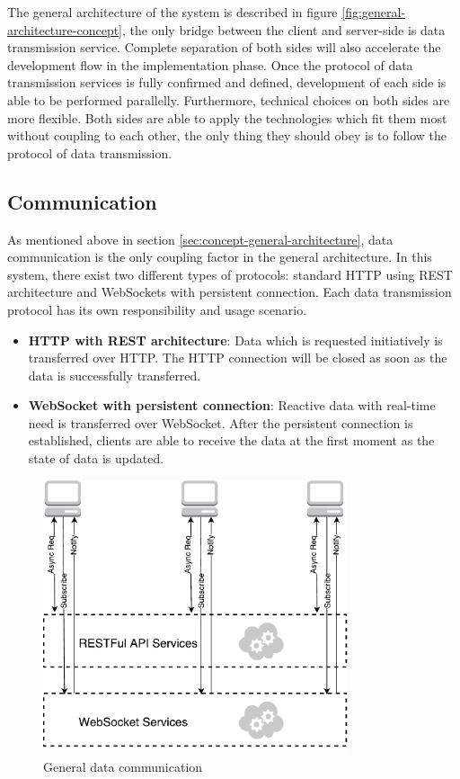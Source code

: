 The general architecture of the system is described in figure \ref{fig:general-architecture-concept}, the only bridge between the client and server-side is data transmission service. Complete separation of both sides will also accelerate the development flow in the implementation phase. Once the protocol of data transmission services is fully confirmed and defined, development of each side is able to be performed parallelly. Furthermore, technical choices on both sides are more flexible. Both sides are able to apply the technologies which fit them most without coupling to each other, the only thing they should obey is to follow the protocol of data transmission.

\subsection{Communication} \label{subsection:concept-general-communication}
As mentioned above in section \ref{sec:concept-general-architecture}, data communication is the only coupling factor in the general architecture. In this system, there exist two different types of protocols: standard HTTP using REST architecture and WebSockets with persistent connection. Each data transmission protocol has its own responsibility and usage scenario.

\begin{itemize}
\item
\textbf{HTTP with REST architecture}: Data which is requested initiatively is transferred over HTTP. The HTTP connection will be closed as soon as the data is successfully transferred.
\item
\textbf{WebSocket with persistent connection}: Reactive data with real-time need is transferred over WebSocket. After the persistent connection is established, clients are able to receive the data at the first moment as the state of data is updated. 
\end{itemize}

\begin{figure}[!htbp]
  \centering
    \includegraphics[width=0.8\textwidth]{Figures/concept-general-data-communication.pdf}
  \caption{General data communication}
  \label{fig:general-data-communication-concept}
\end{figure}

